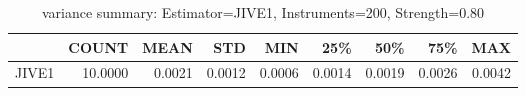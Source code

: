 \begin{table}[ht]
\centering
\caption{variance summary: Estimator=JIVE1, Instruments=200, Strength=0.80}
\begin{tabular}{lrrrrrrrr}
\toprule
 & COUNT & MEAN & STD & MIN & 25\% & 50\% & 75\% & MAX \\
\midrule
JIVE1 & 10.0000 & 0.0021 & 0.0012 & 0.0006 & 0.0014 & 0.0019 & 0.0026 & 0.0042 \\
\bottomrule
\end{tabular}
\end{table}
